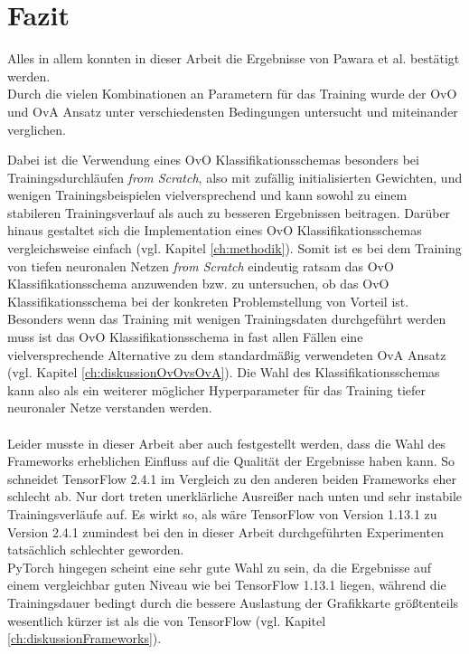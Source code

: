\chapter{Fazit}
\label{ch:fazit}
Alles in allem konnten in dieser Arbeit die Ergebnisse von Pawara et al. \cite{pawaraPaper} bestätigt werden.\\
Durch die vielen Kombinationen an Parametern für das Training wurde der OvO und OvA Ansatz unter verschiedensten Bedingungen untersucht und miteinander verglichen.

Dabei ist die Verwendung eines OvO Klassifikationsschemas besonders bei Trainingsdurchläufen \textit{from Scratch}, also mit zufällig initialisierten Gewichten, und wenigen Trainingsbeispielen vielversprechend und kann sowohl zu einem stabileren Trainingsverlauf als auch zu besseren Ergebnissen beitragen. Darüber hinaus gestaltet sich die Implementation eines OvO Klassifikationsschemas vergleichsweise einfach (vgl. Kapitel \ref{ch:methodik}). Somit ist es bei dem Training von tiefen neuronalen Netzen \textit{from Scratch} eindeutig ratsam das OvO Klassifikationsschema anzuwenden bzw. zu untersuchen, ob das OvO Klassifikationsschema bei der konkreten Problemstellung von Vorteil ist. Besonders wenn das Training mit wenigen Trainingsdaten durchgeführt werden muss ist das OvO Klassifikationsschema in fast allen Fällen eine vielversprechende Alternative zu dem standardmäßig verwendeten OvA Ansatz (vgl. Kapitel \ref{ch:diskussionOvOvsOvA}). Die Wahl des Klassifikationsschemas kann also als ein weiterer möglicher Hyperparameter für das Training tiefer neuronaler Netze verstanden werden.\\\\

Leider musste in dieser Arbeit aber auch festgestellt werden, dass die Wahl des Frameworks erheblichen Einfluss auf die Qualität der Ergebnisse haben kann. So schneidet TensorFlow 2.4.1 \cite{tensorflow} im Vergleich zu den anderen beiden Frameworks eher schlecht ab. Nur dort treten unerklärliche Ausreißer nach unten und sehr instabile Trainingsverläufe auf. Es wirkt so, als wäre TensorFlow \cite{tensorflow} von Version 1.13.1 zu Version 2.4.1 zumindest bei den in dieser Arbeit durchgeführten Experimenten tatsächlich schlechter geworden.\\
PyTorch \cite{pytorch} hingegen scheint eine sehr gute Wahl zu sein, da die Ergebnisse auf einem vergleichbar guten Niveau wie bei TensorFlow 1.13.1 \cite{tensorflow} liegen, während die Trainingsdauer bedingt durch die bessere Auslastung der Grafikkarte größtenteils wesentlich kürzer ist als die von TensorFlow \cite{tensorflow} (vgl. Kapitel \ref{ch:diskussionFrameworks}).\\\\

